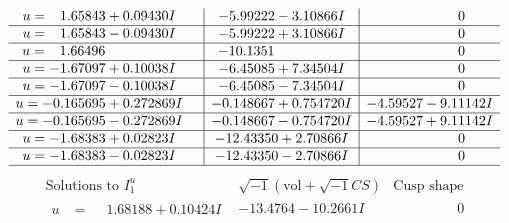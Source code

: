 \documentclass[1p]{elsarticle_modified}
\theoremstyle{definition}
\newcommand{\I}{\sqrt{-1}}
\begin{document}
$$\begin{array}{c|c|c}
\begin{aligned}
u &= \phantom{-}1.65843 + 0.09430 I\end{aligned}
 & -5.99222 - 3.10866 I & \phantom{-0.000000 } 0 \\ \hline\begin{aligned}
u &= \phantom{-}1.65843 - 0.09430 I\end{aligned}
 & -5.99222 + 3.10866 I & \phantom{-0.000000 } 0 \\ \hline\begin{aligned}
u &= \phantom{-}1.66496\phantom{ +0.000000I}\end{aligned}
 & -10.1351\phantom{ +0.000000I} & \phantom{-0.000000 } 0 \\ \hline\begin{aligned}
u &= -1.67097 + 0.10038 I\end{aligned}
 & -6.45085 + 7.34504 I & \phantom{-0.000000 } 0 \\ \hline\begin{aligned}
u &= -1.67097 - 0.10038 I\end{aligned}
 & -6.45085 - 7.34504 I & \phantom{-0.000000 } 0 \\ \hline\begin{aligned}
u &= -0.165695 + 0.272869 I\end{aligned}
 & -0.148667 + 0.754720 I & -4.59527 - 9.11142 I \\ \hline\begin{aligned}
u &= -0.165695 - 0.272869 I\end{aligned}
 & -0.148667 - 0.754720 I & -4.59527 + 9.11142 I \\ \hline\begin{aligned}
u &= -1.68383 + 0.02823 I\end{aligned}
 & -12.43350 + 2.70866 I & \phantom{-0.000000 } 0 \\ \hline\begin{aligned}
u &= -1.68383 - 0.02823 I\end{aligned}
 & -12.43350 - 2.70866 I & \phantom{-0.000000 } 0\\
 \hline 
 \end{array}$$\newpage$$\begin{array}{c|c|c}  
\text{Solutions to }I^u_{1}& \I (\text{vol} + \sqrt{-1}CS) & \text{Cusp shape}\\
 \hline 
\begin{aligned}
u &= \phantom{-}1.68188 + 0.10424 I\end{aligned}
 & -13.4764 - 10.2661 I & \phantom{-0.000000 } 0 \\ \hline\begin{aligned}

\end{aligned}
\end{array}$$
\end{document}
